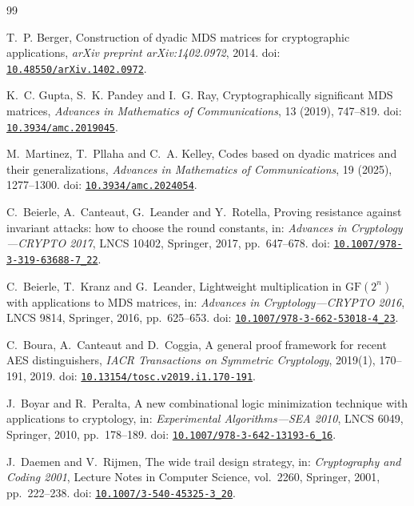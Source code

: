 \documentclass[10pt,reqno]{amsart}
\theoremstyle{plain}
\theoremstyle{remark}\newtheorem{remark}[theorem]{Remark}
\theoremstyle{definition}\newtheorem{definition}[theorem]{Definition}
\begin{document}
\begin{thebibliography}{99}

T.~P. Berger,
Construction of dyadic MDS matrices for cryptographic applications,
\emph{arXiv preprint arXiv:1402.0972}, 2014.
doi: \href{https://doi.org/10.48550/arXiv.1402.0972}{\nolinkurl{10.48550/arXiv.1402.0972}}.

K.~C. Gupta, S.~K. Pandey and I.~G. Ray,
Cryptographically significant MDS matrices,
\emph{Advances in Mathematics of Communications},
13 (2019), 747--819.
doi: \href{https://doi.org/10.3934/amc.2019045}{\nolinkurl{10.3934/amc.2019045}}.

M.~Martinez, T.~Pllaha and C.~A. Kelley,
Codes based on dyadic matrices and their generalizations,
\emph{Advances in Mathematics of Communications}, 19 (2025), 1277--1300.
doi: \href{https://doi.org/10.3934/amc.2024054}{\nolinkurl{10.3934/amc.2024054}}.


C.~Beierle, A.~Canteaut, G.~Leander and Y.~Rotella,
Proving resistance against invariant attacks:
how to choose the round constants,
in: \emph{Advances in Cryptology---CRYPTO 2017},
LNCS 10402, Springer, 2017, pp.~647--678. doi: \href{https://doi.org/10.1007/978-3-319-63688-7_22}{\nolinkurl{10.1007/978-3-319-63688-7_22}}.

C.~Beierle, T.~Kranz and G.~Leander,
Lightweight multiplication in \(\mathrm{GF}(2^n)\) with applications
to MDS matrices,
in: \emph{Advances in Cryptology---CRYPTO 2016},
LNCS 9814, Springer, 2016, pp.~625--653. doi: \href{https://doi.org/10.1007/978-3-662-53018-4_23}{\nolinkurl{10.1007/978-3-662-53018-4_23}}.

C.~Boura, A.~Canteaut and D.~Coggia,
A general proof framework for recent AES distinguishers,
\emph{IACR Transactions on Symmetric Cryptology},
2019(1), 170--191, 2019. doi: \href{https://doi.org/10.13154/tosc.v2019.i1.170-191}{\nolinkurl{10.13154/tosc.v2019.i1.170-191}}.

J.~Boyar and R.~Peralta,
A new combinational logic minimization technique with applications to
cryptology,
in: \emph{Experimental Algorithms---SEA 2010},
LNCS 6049, Springer, 2010, pp.~178--189. doi: \href{https://doi.org/10.1007/978-3-642-13193-6_16}{\nolinkurl{10.1007/978-3-642-13193-6_16}}.

J.~Daemen and V.~Rijmen,
The wide trail design strategy,
in: \emph{Cryptography and Coding 2001}, Lecture Notes in Computer Science, vol.~2260, Springer, 2001, pp.~222--238.
doi: \href{https://doi.org/10.1007/3-540-45325-3_20}{\nolinkurl{10.1007/3-540-45325-3_20}}.


\end{thebibliography}
\end{document}

